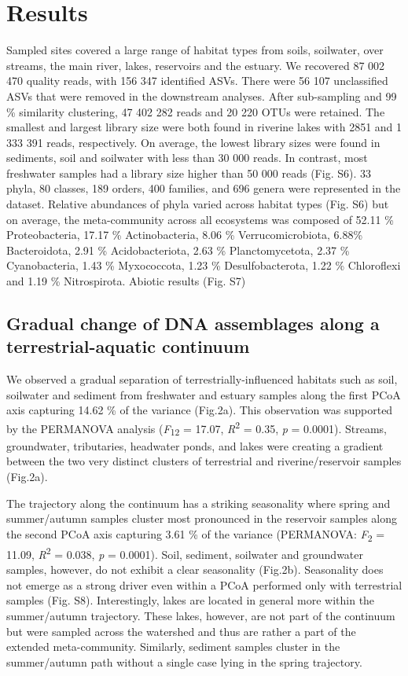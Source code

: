 \documentclass[12pt,a4paper]{article} %
\begin{document}
\section*{Results}
Sampled sites covered a large range of habitat types from soils, soilwater, over streams, the main river, lakes, reservoirs and the estuary. We recovered 87 002 470 quality reads, with 156 347 identified ASVs. There were 56 107 unclassified ASVs that were removed in the downstream analyses. After sub-sampling and 99 \% similarity clustering, 47 402 282 reads and 20 220 OTUs were retained. The smallest and largest library size were both found in riverine lakes with 2851 and 1 333 391 reads, respectively. On average, the lowest library sizes were found in sediments, soil and soilwater with less than 30 000 reads. In contrast, most freshwater samples had a library size higher than 50 000 reads (Fig. S6). 33 phyla, 80 classes,  189 orders, 400 families, and 696 genera were represented in the dataset. Relative abundances of phyla varied across habitat types (Fig. S6) but on average, the meta-community across all ecosystems was composed of 52.11 \% Proteobacteria, 17.17 \% Actinobacteria, 8.06 \% Verrucomicrobiota, 6.88\% Bacteroidota, 2.91 \% Acidobacteriota, 2.63 \% Planctomycetota, 2.37 \% Cyanobacteria, 1.43 \% Myxococcota, 1.23 \% Desulfobacterota, 1.22 \% Chloroflexi and 1.19 \% Nitrospirota.
Abiotic results (Fig. S7)

\subsection*{Gradual change of DNA assemblages along a terrestrial-aquatic continuum}
We observed a gradual separation of terrestrially-influenced habitats such as soil, soilwater and sediment from freshwater and estuary samples along the first PCoA axis capturing 14.62 \% of the variance (Fig.2a). This observation was supported by the PERMANOVA analysis (\textit{F}\textsubscript{12} = 17.07, \textit{R}\textsuperscript{2} = 0.35, \textit{p} = 0.0001). Streams, groundwater, tributaries, headwater ponds, and lakes were creating a gradient between the two very distinct clusters of terrestrial and riverine/reservoir samples (Fig.2a).

The trajectory along the continuum has a striking seasonality where spring and summer/autumn samples cluster most pronounced in the reservoir samples along the second PCoA axis capturing 3.61 \% of the variance (PERMANOVA: \textit{F}\textsubscript{2} = 11.09, \textit{R}\textsuperscript{2} = 0.038, \textit{p} = 0.0001). Soil, sediment, soilwater and groundwater samples, however, do not exhibit a clear seasonality (Fig.2b). Seasonality does not emerge as a strong driver even within a PCoA performed only with terrestrial samples (Fig. S8). Interestingly, lakes are located in general more within the summer/autumn trajectory. These lakes, however, are not part of the continuum but were sampled across the watershed and thus are rather a part of the extended meta-community. Similarly, sediment samples cluster in the summer/autumn path without a single case lying in the spring trajectory.
\end{document}
